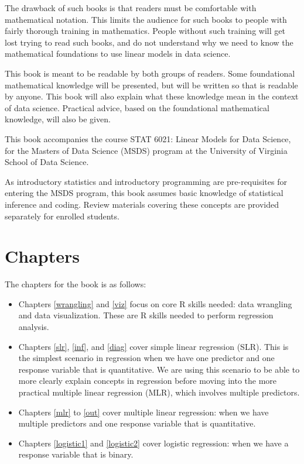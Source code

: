 \documentclass[
]{book}
\begin{document}
The drawback of such books is that readers must be comfortable with mathematical notation. This limits the audience for such books to people with fairly thorough training in mathematics. People without such training will get lost trying to read such books, and do not understand why we need to know the mathematical foundations to use linear models in data science.

This book is meant to be readable by both groups of readers. Some foundational mathematical knowledge will be presented, but will be written so that is readable by anyone. This book will also explain what these knowledge mean in the context of data science. Practical advice, based on the foundational mathematical knowledge, will also be given.

This book accompanies the course STAT 6021: Linear Models for Data Science, for the Masters of Data Science (MSDS) program at the University of Virginia School of Data Science.

As introductory statistics and introductory programming are pre-requisites for entering the MSDS program, this book assumes basic knowledge of statistical inference and coding. Review materials covering these concepts are provided separately for enrolled students.

\hypertarget{chapters}{%
\section*{Chapters}\label{chapters}}

The chapters for the book is as follows:

\begin{itemize}
\item
  Chapters \ref{wrangling} and \ref{viz} focus on core R skills needed: data wrangling and data visualization. These are R skills needed to perform regression analysis.
\item
  Chapters \ref{slr}, \ref{inf}, and \ref{diag} cover simple linear regression (SLR). This is the simplest scenario in regression when we have one predictor and one response variable that is quantitative. We are using this scenario to be able to more clearly explain concepts in regression before moving into the more practical multiple linear regression (MLR), which involves multiple predictors.
\item
  Chapters \ref{mlr} to \ref{out} cover multiple linear regression: when we have multiple predictors and one response variable that is quantitative.
\item
  Chapters \ref{logistic1} and \ref{logistic2} cover logistic regression: when we have a response variable that is binary.
\end{itemize}
\end{document}
